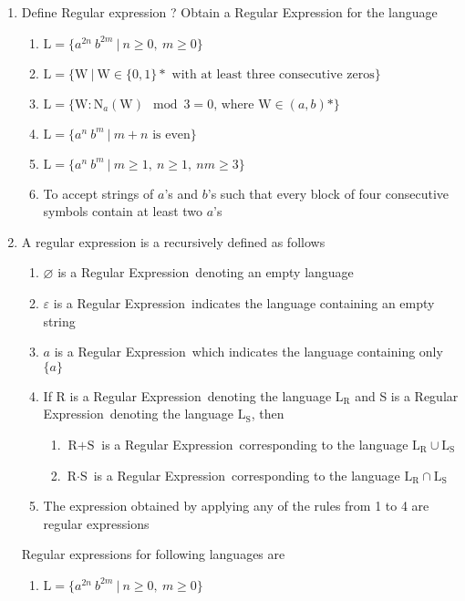 \documentclass{article}
\def \answer {\item [$\rightarrow$]}
\def \RE {Regular Expression~}
\begin{document}
	\begin{enumerate}[label=\arabic*)]
		\item Define Regular expression ? Obtain a Regular Expression for the language
		\begin{enumerate}[label=\alph*)]
			\item $\text{L} = \{a^{2n}\ b^{2m}~|~n \ge 0,~m \ge 0\}$
			\item $\text{L} = \{\text{W}~|~\text{W} \in \{0,1\} \ast
				\text{ with at least three consecutive zeros}\}$
			\item $\text{L} = \{\text{W} : \text{N}_a(\text{W}) \mod 3=0
				\text{, where } \text{W} \in (a,b) \ast\}$
			\item $\text{L} = \{a^n\ b^m~|~m+n \text{ is even}\}$
			\item $\text{L} = \{a^n\ b^m~|~m \ge 1,~n \ge 1,~nm \ge 3\}$
			\item To accept strings of $a$'s and $b$'s such that every block of four consecutive symbols
				contain at least two $a$'s
		\end{enumerate}
		\answer A regular expression is a recursively defined as follows
			\begin{enumerate}[label=\roman*)]
				\item $\varnothing$ is a \RE denoting an empty language
				\item $\varepsilon$ is a \RE indicates the language containing an empty string
				\item $a$ is a \RE which indicates the language containing only $\{a\}$
				\item If R is a \RE denoting the language $\text{L}_\text{R}$ and S is a \RE denoting the
					language $\text{L}_\text{S}$, then
					\begin{enumerate}[label=\alph*)]
						\item $\text{R}+\text{S}$ is a \RE corresponding to the language
							$\text{L}_\text{R} \cup \text{L}_\text{S}$
						\item $\text{R}\cdot\text{S}$ is a \RE corresponding to the language
							$\text{L}_\text{R} \cap \text{L}_\text{S}$
					\end{enumerate}
				\item The expression obtained by applying any of the rules from 1 to 4 are regular expressions
			\end{enumerate}
			Regular expressions for following languages are
			\begin{enumerate}[label=\alph*)]
				\item $\text{L} = \{a^{2n}\ b^{2m}~|~n \ge 0,~m \ge 0\}$ \\

\end{enumerate}
\end{enumerate}
\end{document}
